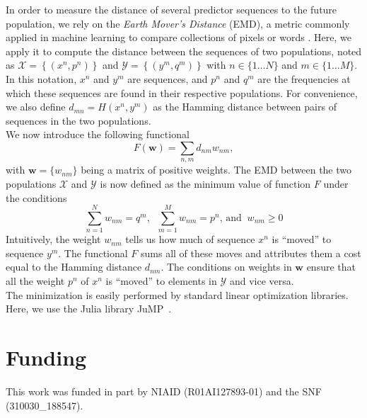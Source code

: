 \documentclass[reprint,amsmath,amssymb,superscriptaddress,showpacs,rmp]{revtex4-1}
\begin{document}
	In order to measure the distance of several predictor sequences to the future population, we rely on the \emph{Earth Mover's Distance} (EMD), a metric commonly applied in machine learning to compare collections of pixels or words \cite{710701,10.5555/3045118.3045221}. Here, we apply it to compute the distance between the sequences of two populations, noted as $\mathcal{X} = \left\{(x^n, p^n)\right\}$ and $\mathcal{Y}=\left\{(y^m,q^m)\right\}$ with $n\in\{1\ldots N\}$ and $m\in\{1\ldots M\}$. In this notation, $x^n$ and $y^m$ are sequences, and $p^n$ and $q^m$ are the frequencies at which these sequences are found in their respective populations. For convenience, we also define $d_{mn} = H(x^n,y^m)$ as the Hamming distance between pairs of sequences in the two populations. \\
	We now introduce the following functional
	$$ F(\mathbf{w}) = \sum_{n,m} d_{nm}w_{nm}, $$
	with $\mathbf{w} = \{w_{nm}\}$ being a matrix of positive weights. The EMD between the two populations $\mathcal{X}$ and $\mathcal{Y}$ is now defined as the minimum value of function $F$ under the conditions
	\begin{equation*}
			\sum_{n=1}^N w_{nm} = q^m,\;\; \sum_{m=1}^M w_{nm} = p^n, \,\text{and}\;\; w_{nm}\geq 0
	\end{equation*}
	Intuitively, the weight $w_{nm}$ tells us how much of sequence $x^n$ is ``moved'' to sequence $y^m$. The functional $F$ sums all of these moves and attributes them a cost equal to the Hamming distance $d_{nm}$. The conditions on weights in $\mathbf{w}$ ensure that all the weight $p^n$ of $x^n$ is ``moved'' to elements in $\mathcal{Y}$ and vice versa. \\
	The minimization is easily performed by standard linear optimization libraries. Here, we use the Julia library {JuMP}~\cite{DunningHuchetteLubin2017}.


\section{Funding}
This work was funded in part by NIAID (R01AI127893-01) and the SNF (310030\_188547).




\newpage
\appendix
\setcounter{figure}{0}
\renewcommand{\figurename}{Figure S}
\setcounter{table}{0}
\renewcommand{\tablename}{Table S}
\onecolumngrid
\end{document}

